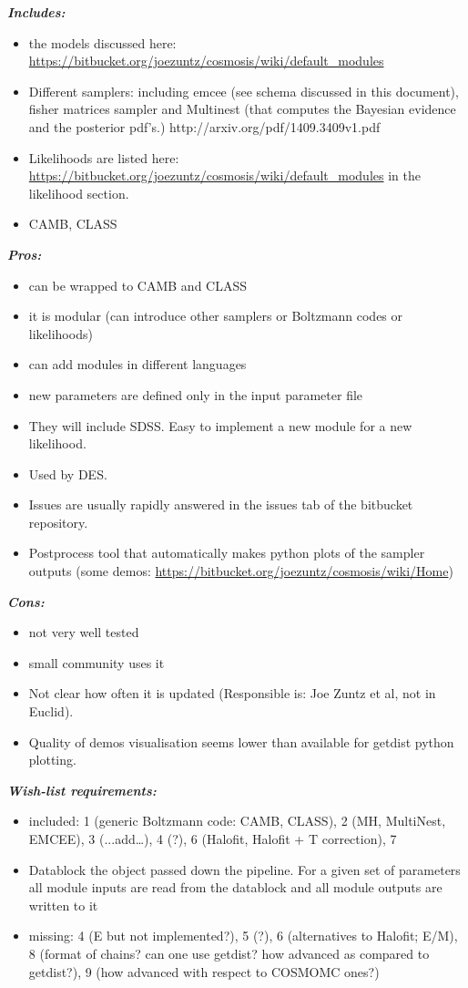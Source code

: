 {\it \bf Includes: }
\begin{itemize}
\item the models discussed here: \url{https://bitbucket.org/joezuntz/cosmosis/wiki/default_modules}
 \item Different samplers: including emcee (see schema discussed in this document), fisher matrices sampler and Multinest (that computes the Bayesian evidence and the posterior pdf's.) http://arxiv.org/pdf/1409.3409v1.pdf
 \item Likelihoods are listed here: \url{https://bitbucket.org/joezuntz/cosmosis/wiki/default_modules} in the likelihood section.
 \item CAMB, CLASS
\end{itemize}

{\it \bf Pros:} 
\begin{itemize}
 \item can be wrapped to CAMB and CLASS
 \item it is modular (can introduce other samplers or Boltzmann codes or likelihoods) 
 \item can add modules in different languages
 \item new parameters are defined only in the input parameter file
 \item They will include SDSS. Easy to implement a new module for a new likelihood.
 \item Used by DES.
 \item Issues are usually rapidly answered in the issues tab of the bitbucket repository.
 \item Postprocess tool that automatically makes python plots of the sampler outputs (some demos: \url{https://bitbucket.org/joezuntz/cosmosis/wiki/Home})
\end{itemize}

{\it \bf Cons:} 
\begin{itemize}
 \item not very well tested
 \item small community uses it
 \item Not clear how often it is updated (Responsible is: Joe Zuntz et al, not in Euclid).
 \item Quality of demos visualisation seems lower than available for getdist python plotting.
\end{itemize}

{\it \bf Wish-list requirements: }
\begin{itemize}
 \item included: 1 (generic Boltzmann code: CAMB, CLASS), 2 (MH, MultiNest, EMCEE), 3 (...add…), 4 (?), 6 (Halofit, Halofit + T correction), 7
 \item Datablock the object passed down the pipeline. For a given set of parameters all module inputs are read from the datablock and all module outputs are written to it 
 \item missing: 4 (E but not implemented?), 5 (?), 6 (alternatives to Halofit; E/M), 8 (format of chains? can one use getdist? how advanced as compared to getdist?), 9 
 (how advanced with respect to COSMOMC ones?) 
\end{itemize}

